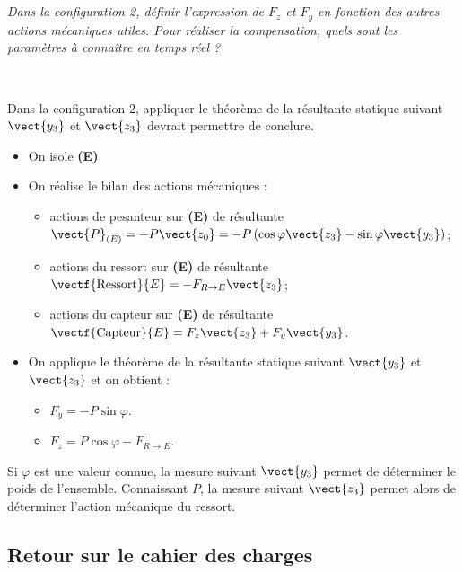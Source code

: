 \fi
\subparagraph{}
\textit{Dans la configuration 2, définir l’expression de $F_z$ et $F_y$ en fonction des autres actions mécaniques utiles. Pour réaliser la compensation, quels sont les paramètres à connaître en temps réel ?}
\ifprof
\begin{corrige} ~\\

\begin{methode}
Dans la configuration 2, appliquer le théorème de la résultante statique suivant $\vect{y_3}$ et $\vect{z_3}$ devrait permettre de conclure. 
\end{methode}
\begin{itemize}
\item On isole \textbf{(E)}.
\item On réalise le bilan des actions mécaniques : 
\begin{itemize}
\item actions de pesanteur sur \textbf{(E)} de résultante $\vect{P}_{(E)}=-P\vect{z_0}=-P\left(\cos\varphi  \vect{z_3}-\sin\varphi  \vect{y_3}\right)$;
\item actions du ressort sur \textbf{(E)} de résultante $\vectf{\text{Ressort}}{E}=-F_{R\to E} \vect{z_3}$;
\item actions du capteur sur \textbf{(E)} de résultante $\vectf{\text{Capteur}}{E}=F_z\vect{z_3}+F_y\vect{y_3}$.
\end{itemize}
\item On applique le théorème de la résultante statique suivant $\vect{y_3}$ et $\vect{z_3}$ et on obtient : 
\begin{itemize}
\item $F_y = -P\sin\varphi $. 
\item $F_z = P\cos\varphi  - F_{R\to E}$. 
\end{itemize}
\end{itemize}
Si $\varphi$ est une valeur connue, la mesure suivant $\vect{y_3}$ permet de déterminer le poids de l'ensemble. Connaissant $P$, la mesure suivant $\vect{z_3}$ permet alors de déterminer l'action mécanique du ressort. 
\end{corrige}
\else
\fi



\subsection*{Retour sur le cahier des charges}
\ifprof
\else


